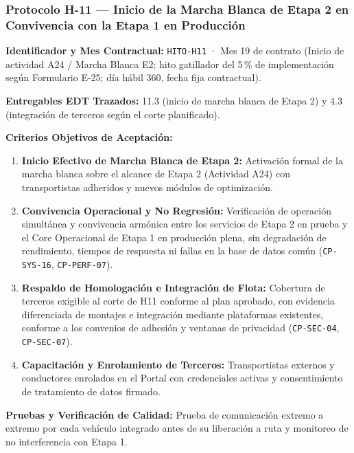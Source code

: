 \subsubsection*{Protocolo H-11 — Inicio de la Marcha Blanca de Etapa 2 en Convivencia con la Etapa 1 en Producción}\label{sec:9-proto-h11}
\par\noindent\textbf{Identificador y Mes Contractual:} \texttt{HITO-H11} · Mes 19 de contrato (Inicio de actividad A24 / Marcha Blanca E2; hito gatillador del 5\,\% de implementación según Formulario E-25; día hábil 360, fecha fija contractual).\par
\par\noindent\textbf{Entregables EDT Trazados:} 11.3 (inicio de marcha blanca de Etapa 2) y 4.3 (integración de terceros según el corte planificado).\par
\par\noindent\textbf{Criterios Objetivos de Aceptación:}
\begin{enumerate}
  \item \textbf{Inicio Efectivo de Marcha Blanca de Etapa 2:} Activación formal de la marcha blanca sobre el alcance de Etapa 2 (Actividad A24) con transportistas adheridos y nuevos módulos de optimización.
  \item \textbf{Convivencia Operacional y No Regresión:} Verificación de operación simultánea y convivencia armónica entre los servicios de Etapa 2 en prueba y el Core Operacional de Etapa 1 en producción plena, sin degradación de rendimiento, tiempos de respuesta ni fallas en la base de datos común (\texttt{CP-SYS-16}, \texttt{CP-PERF-07}).
  \item \textbf{Respaldo de Homologación e Integración de Flota:} Cobertura de terceros exigible al corte de H11 conforme al plan aprobado, con evidencia diferenciada de montajes e integración mediante plataformas existentes, conforme a los convenios de adhesión y ventanas de privacidad (\texttt{CP-SEC-04}, \texttt{CP-SEC-07}).
  \item \textbf{Capacitación y Enrolamiento de Terceros:} Transportistas externos y conductores enrolados en el Portal con credenciales activas y consentimiento de tratamiento de datos firmado.
\end{enumerate}
\par\noindent\textbf{Pruebas y Verificación de Calidad:} Prueba de comunicación extremo a extremo por cada vehículo integrado antes de su liberación a ruta y monitoreo de no interferencia con Etapa 1.\par
